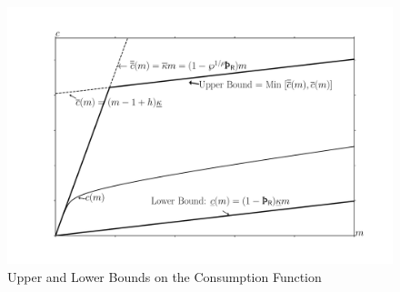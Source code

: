 \begin{figure}
\centering
\includegraphics[width=6in]{Figures/cFuncBounds}
\caption{Upper and Lower Bounds on the Consumption Function}
\label{fig:cFuncBounds}
\end{figure}
